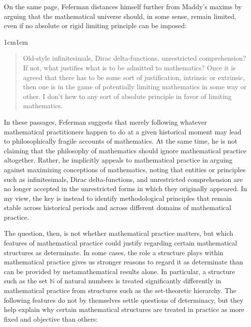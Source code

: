 \documentclass[11pt,a4paper]{book}
\theoremstyle{plain}
\begin{document}
On the same page, Feferman distances himself further from Maddy’s maxims by arguing that the mathematical universe should, in some sense, remain limited, even if no absolute or rigid limiting principle can be imposed:

\begin{adjustwidth}{1cm}{1cm}
\small
\begin{quote}
Old-style infinitesimals, Dirac delta-functions, unrestricted comprehension? If not, what justifies what is to be admitted to mathematics? Once it is agreed that there has to be some sort of justification, intrinsic or extrinsic, then one is in the game of potentially limiting mathematics in some way or other. I don't hew to any sort of absolute principle in favor of limiting mathematics.
\end{quote}
\end{adjustwidth}

In these passages, Feferman suggests that merely following whatever mathematical practitioners happen to do at a given historical moment may lead to philosophically fragile accounts of mathematics. At the same time, he is not claiming that the philosophy of mathematics should ignore mathematical practice altogether. Rather, he implicitly appeals to mathematical practice in arguing against maximizing conceptions of mathematics, noting that entities or principles such as infinitesimals, Dirac delta-functions, and unrestricted comprehension are no longer accepted in the unrestricted forms in which they originally appeared. In my view, the key is instead to identify methodological principles that remain stable across historical periods and across different domains of mathematical practice.

The question, then, is not whether mathematical practice matters, but which features of mathematical practice could justify regarding certain mathematical structures as determinate. In some cases, the role a structure plays within mathematical practice gives us stronger reasons to regard it as determinate than can be provided by metamathematical results alone. In particular, a structure such as the set $\mathbb{N}$ of natural numbers is treated significantly differently in mathematical practice from structures such as the set-theoretic hierarchy. The following features do not by themselves settle questions of determinacy, but they help explain why certain mathematical structures are treated in practice as more fixed and objective than others:
\end{document}
